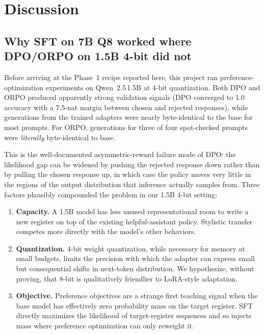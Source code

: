 \section{Discussion}
\label{sec:discussion}

\subsection{Why SFT on 7B Q8 worked where DPO/ORPO on 1.5B 4-bit did not}
\label{sec:why-it-worked}

Before arriving at the Phase~1 recipe reported here, this project ran
preference-optimization experiments on Qwen~2.5\,1.5B at 4-bit
quantization. Both DPO \cite{rafailov2023dpo} and ORPO \cite{orpo}
produced apparently strong validation signals (DPO converged to
1.0 accuracy with a 7.5-nat margin between chosen and rejected
responses), while generations from the trained adapters were nearly
byte-identical to the base for most prompts. For ORPO, generations for
three of four spot-checked prompts were \emph{literally} byte-identical
to base.

This is the well-documented asymmetric-reward failure mode of DPO: the
likelihood gap can be widened by pushing the rejected response down rather
than by pulling the chosen response up, in which case the policy
moves very little in the regions of the output distribution that
inference actually samples from. Three factors plausibly compounded the
problem in our 1.5B 4-bit setting:

\begin{enumerate}
  \item \textbf{Capacity.} A 1.5B model has less unused representational
        room to write a new register on top of the existing
        helpful-assistant policy. Stylistic transfer competes more
        directly with the model's other behaviors.
  \item \textbf{Quantization.} 4-bit weight quantization, while necessary
        for memory at small budgets, limits the precision with which the
        adapter can express small but consequential shifts in
        next-token distribution. We hypothesize, without proving, that
        8-bit is qualitatively friendlier to LoRA-style adaptation.
  \item \textbf{Objective.} Preference objectives are a strange first
        teaching signal when the base model has effectively zero
        probability mass on the target register. SFT directly maximizes
        the likelihood of target-register sequences and so injects mass
        where preference optimization can only reweight it.
\end{enumerate}

